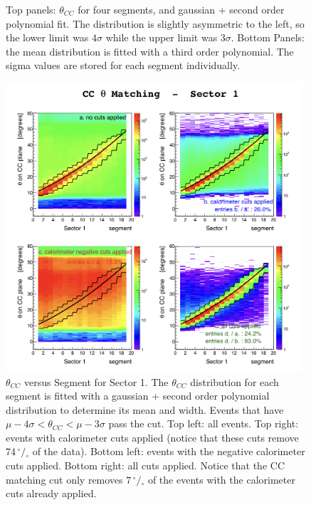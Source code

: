 \begin{figure}[ht]
		\caption{Top panels: $\theta_{CC}$ for four segments, and gaussian + second order
					polynomial fit. The distribution is slightly asymmetric to the
               left, so the lower limit was $4\sigma$ while the upper limit
               was $3\sigma$.
               Bottom Panels: the mean distribution is fitted with a third order
               polynomial. The sigma values are stored for each segment individually. }
 		\label{fig:ccm_slices}
\end{figure}


\begin{figure}[ht]
  \centering
		\includegraphics[width=0.98\textwidth]{img/cut-01ccthmd_sector-1.png}
		\caption{$\theta_{CC}$ versus Segment for Sector 1. The $\theta_{CC}$
               distribution for each segment is fitted with a gaussian +
               second order polynomial distribution to determine its mean
               and width. Events that have $\mu - 4\sigma < \theta_{CC} < \mu - 3\sigma$
               pass the cut.
               Top left: all events. Top right: events with calorimeter cuts applied
               (notice that these cuts remove $74 \,^{\circ\!\!}/\!_\circ$ of the data).
               Bottom left: events with the negative calorimeter cuts applied.
               Bottom right: all cuts applied. Notice that the CC matching cut
               only removes $7  \,^{\circ\!\!}/\!_\circ$ of the events with
               the calorimeter cuts already applied.}
 		\label{fig:ccm_theta}
\end{figure}

